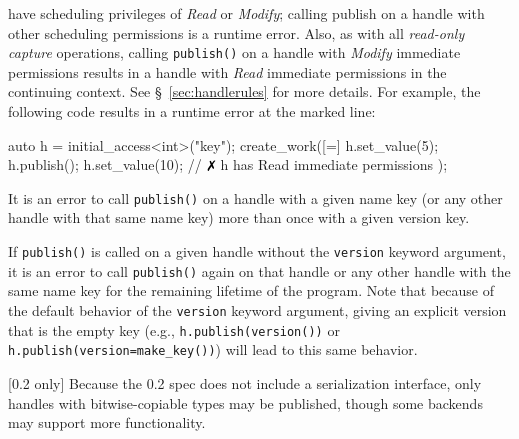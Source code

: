 \begin{compactitem}
  have scheduling privileges of {\it Read} or {\it Modify}; calling publish on a
  handle with other scheduling permissions is a runtime error.  Also, as with
  all {\it read-only capture} operations, calling \texttt{publish()} on a
  handle with {\it Modify} immediate permissions results in a handle with {\it
  Read} immediate permissions in the continuing context.  See
  \S~\ref{sec:handlerules} for more details.  For example, the following code
  results in a runtime error at the marked line:
  \begin{CppCode}
  auto h = initial_access<int>("key");
  create_work([=]{
    h.set_value(5);
    h.publish();
    h.set_value(10); // $\no$ h has Read immediate permissions
  });
  \end{CppCode}
  \item It is an error to call \texttt{publish()} on a handle with a given
  name key (or any other handle with that same name key) more than once with
  a given version key.
  \item If \texttt{publish()} is called on a given handle without the
  \texttt{version} keyword argument, it is an error to call \texttt{publish()}
  again on that handle or any other handle with the same name key for the
  remaining lifetime of the program.  Note that because of the default behavior
  of the \texttt{version} keyword argument, giving an explicit version that is
  the empty key (e.g., \texttt{h.publish(version())} or
  \texttt{h.publish(version=make\_key())}) will lead to this same behavior.
  \item {\color{red} [0.2 only]} Because the 0.2 spec does not include a
  serialization interface, only handles with bitwise-copiable types may be
  published, though some backends may support more functionality.
\end{compactitem}



